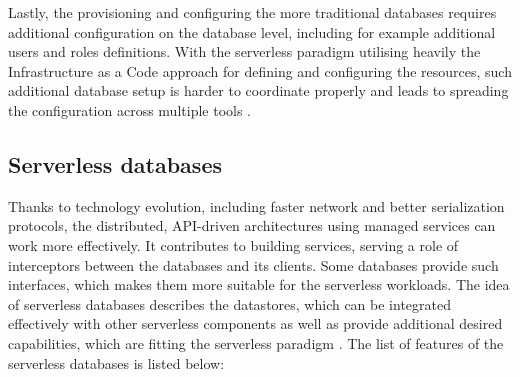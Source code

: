 Lastly, the provisioning and configuring the more traditional databases requires additional configuration on the database level, including for example additional users and roles definitions.
With the serverless paradigm utilising heavily the Infrastructure as a Code approach for defining and configuring the resources, such additional database setup is harder to coordinate properly and leads to spreading the configuration across multiple tools \cite{ServerlessAuroraWhatItMeansAndWhyItsTheFutureOfData}.

\subsection{Serverless databases}

Thanks to technology evolution, including faster network and better serialization protocols, the distributed, API-driven architectures using managed services can work more effectively.
It contributes to building services, serving a role of interceptors between the databases and its clients.
Some databases provide such interfaces, which makes them more suitable for the serverless workloads.
The idea of serverless databases describes the datastores, which can be integrated effectively with other serverless components as well as provide additional desired capabilities, which are fitting the serverless paradigm \cite{ServerlessAuroraWhatItMeansAndWhyItsTheFutureOfData}.
The list of features of the serverless databases is listed below:

